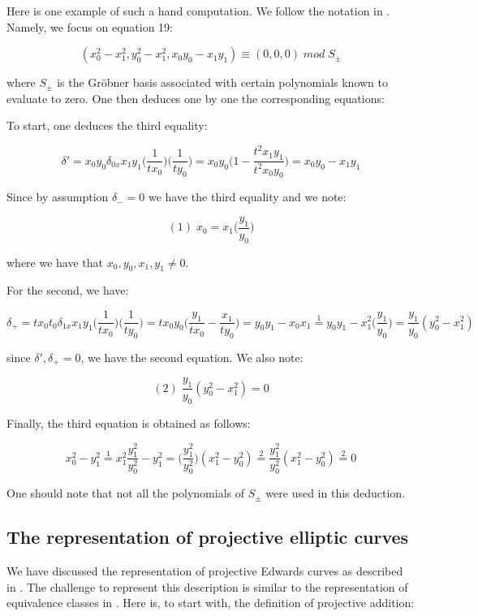 Here is one example of such a hand computation. We follow the notation in \cite{hales2016group}. Namely, we focus on equation 19:

$$(x_0^2 - x_1^2,y_0^2 - x_1^2,x_0y_0 - x_1 y_1) \equiv (0,0,0) \; mod \; S_{\pm}$$

where $S_{\pm}$ is the Gröbner basis associated with certain polynomials known to evaluate to zero. One then deduces one by one the corresponding equations:

To start, one deduces the third equality:

$$\delta' = x_0 y_0 \delta_{0x} x_1 y_1 \Big(\frac{1}{t x_0}\Big) \Big(\frac{1}{t y_0}\Big) = 
x_0 y_0 \Big(1 - \frac{t^2 x_1 y_1}{t^2 x_0 y_0}\Big) = x_0y_0 - x_1 y_1$$

Since by assumption $\delta_{-} = 0$ we have the third equality and we note:

$$(1) \; x_0 = x_1 \Big(\frac{y_1}{y_0}\Big)$$

where we have that $x_0,y_0,x_1,y_1 \neq 0$.

For the second, we have:

$$\delta_{+} = t x_0 t_0 \delta_{1x} x_1 y_1 \Big(\frac{1}{tx_0}\Big) \Big(\frac{1}{ty_0}\Big) = t x_0 y_0 \Big(\frac{y_1}{t x_0} - \frac{x_1}{t y_0}\Big) = y_0 y_1 - x_0 x_1 \stackrel{1}{=} y_0 y_1 - x_1^2 \Big(\frac{y_1}{y_0}\Big) = \frac{y_1}{y_0} (y_0^2 - x_1^2)$$

since $\delta',\delta_{+} = 0$, we have the second equation. We also note: 

$$(2) \; \frac{y_1}{y_0} (y_0^2 - x_1^2) = 0$$

Finally, the third equation is obtained as follows:

$$x_0^2 - y_1^2 \stackrel{1}{=} x_1^2 \frac{y_1^2}{y_0^2} - y_1^2 = \Big(\frac{y_1^2}{y_0^2}\Big) (x_1^2 - y_0^2) \stackrel{2}{=} \frac{y_1^2}{y_0^2} (x_1^2 - y_0^2) \stackrel{2}{=} 0$$

One should note that not all the polynomials of $S_{\pm}$ were used in this deduction.

\subsection{The representation of projective elliptic curves}

We have discussed the representation of projective Edwards curves as described in \cite{hales2016group}. The challenge to represent this description is similar to the representation of equivalence classes in \cite{paulson2006defining}. Here is, to start with, the definition of projective addition:

